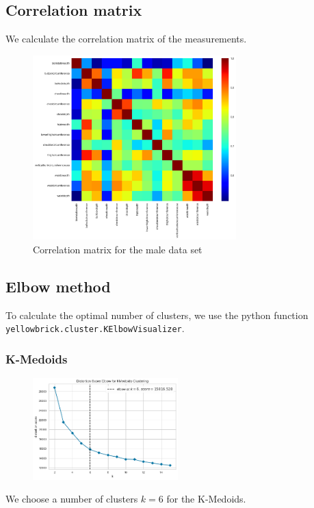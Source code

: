 \documentclass[12pt,a4paper,openany,UKenglish]{scrreprt}
\begin{document}
\subsection{Correlation matrix}
We calculate the correlation matrix of the measurements.
\begin{figure}[H]
	\centering
	\caption{Correlation matrix for the male data set}
	\includegraphics[width=0.7\textwidth]{../Images/MCorr.png}
\end{figure}

\subsection{Elbow method}
To calculate the optimal number of clusters, we use the python function \\
\texttt{yellowbrick.cluster.KElbowVisualizer}.
\subsubsection{K-Medoids}
\begin{figure}[H]
	\centering
	\includegraphics[width=0.5\textwidth]{../Images/MMedoidsElbow.png}
\end{figure}
We choose a number of clusters $k=6$ for the K-Medoids.
\end{document}

